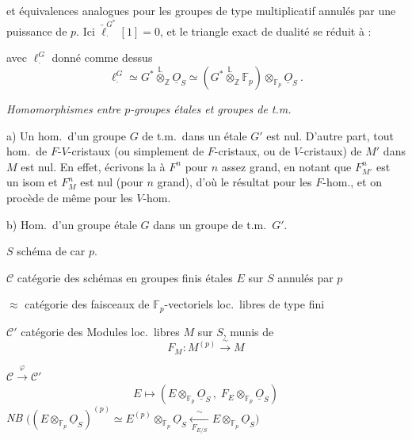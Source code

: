 \documentclass[11pt,a4paper]{article}
\begin{document}
et équivalences analogues pour les groupes  de type
multiplicatif annulés par une puissance de $p$. 
Ici $\check{\ell}^{G^*}_{\cdot}[1]=0$, et le triangle exact de dualité se
réduit à :


avec $\ell^{G}_{\cdot}$ donné comme dessus
\[
  \ell^{G}_{\cdot}\simeq G^*\overset{\mathbb{L}}{\otimes}_{\mathbb{Z}}\underline{O}_S
  \simeq(G^*\overset{\mathbb{L}}{\otimes}_{\mathbb{Z}}\mathbb{F}_p)
  \otimes_{\mathbb{F}_p}\underline{O}_S\ .
\]

\emph{Homomorphismes entre $p$-groupes étales et groupes de t.m.}

a) Un hom.\ d'un groupe $G$ de t.m.\ dans un étale $G'$ est nul. D'autre
part, tout \ill{} hom.\ de $F$-$V$-cristaux (ou simplement de $F$-cristaux,
ou de $V$-cristaux) de $M'$ dans $M$ est nul. En effet, écrivons la
 à $F^n$ pour $n$ assez grand, en notant que
$F^n_{M'}$ est un isom et $F^n_{M}$ est nul (pour $n$ grand), d'où \ill{} le
résultat pour les $F$-hom., et on procède de même pour les $V$-hom.

b) Hom.\ d'un groupe étale $G$ dans un groupe de t.m.\ $G'$.

$S$ schéma de car $p$.

$\mathcal{C}$ catégorie des schémas en groupes finis étales $E$ sur $S$
annulés par $p$

$\approx$ catégorie des faisceaux \ill{} de $\mathbb{F}_p$-vectoriels
loc.\ libres de type fini

$\mathcal{C}'$ catégorie des Modules loc.\ libres $M$ sur $S$, munis de
\[
  F_M\colon M^{(p)}\xrightarrow{\ \sim\ }M
\]

$\mathcal{C}\xrightarrow{\ \varphi\ }\mathcal{C}'$
\[
  E\longmapsto(E\otimes_{\mathbb{F}_p}\underline{O}_S\,,\;
  F_E\otimes_{\mathbb{F}_p}\underline{O}_S)
\]
\emph{NB}
$\bigl((E\otimes_{\mathbb{F}_p}\underline{O}_S)^{(p)}\simeq
E^{(p)}\otimes_{\mathbb{F}_p}\underline{O}_S
\xleftarrow[\ F_{E/S}\ ]{\ \sim\ }E\otimes_{\mathbb{F}_p}\underline{O}_S\bigr)$
\end{document}

